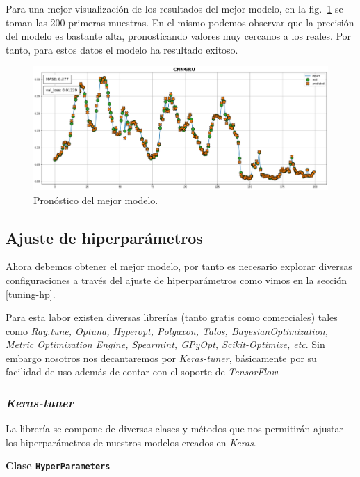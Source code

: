 \documentclass[a4paper,12pt]{article}
\begin{document}
Para una mejor visualización de los resultados del mejor modelo, en la fig.~\ref{fig:fore_best_model} se toman las 200 primeras muestras. En el mismo podemos observar que la precisión del modelo es bastante alta, pronosticando valores muy cercanos a los reales. Por tanto, para estos datos el modelo ha resultado exitoso.

\begin{figure}[H]
	\begin{center}
	\includegraphics[width=1\textwidth]{cnngru_final.png}
  	\caption{Pronóstico del mejor modelo.}
  	\label{fig:fore_best_model}
  	\end{center}
\end{figure}

\subsection{Ajuste de hiperparámetros}
Ahora debemos obtener el mejor modelo, por tanto es necesario explorar diversas configuraciones a través del ajuste de hiperparámetros como vimos en la sección \ref{tuning-hp}.

Para esta labor existen diversas librerías (tanto gratis como comerciales) tales como \textit{Ray.tune, Optuna, Hyperopt, Polyaxon, Talos, BayesianOptimization, Metric Optimization Engine, Spearmint, GPyOpt, Scikit-Optimize, etc}. Sin embargo nosotros nos decantaremos por \textit{Keras-tuner}, básicamente por su facilidad de uso además de contar con el soporte de \textit{TensorFlow}.

\subsubsection{\textit{Keras-tuner}}
La librería se compone de diversas clases y métodos que nos permitirán ajustar los hiperparámetros de nuestros modelos creados en \textit{Keras}. \citep{keras-tuner}

\textbf{Clase \texttt{HyperParameters}}
\end{document}
